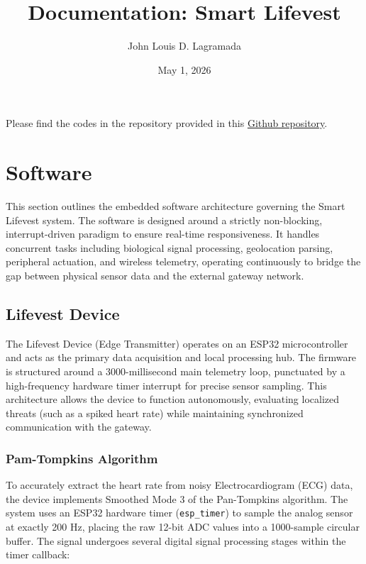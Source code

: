\documentclass{article}
\title{Documentation: Smart Lifevest}
\author{John Louis D. Lagramada}
\date{May 1, 2026}
\begin{document}
\maketitle

Please find the codes in the repository provided in this \href{https://github.com/lukasdante/esp32-lifevest-telemetry-2}{Github repository}.

\section{Software}
This section outlines the embedded software architecture governing the Smart Lifevest system. The software is designed around a strictly non-blocking, interrupt-driven paradigm to ensure real-time responsiveness. It handles concurrent tasks including biological signal processing, geolocation parsing, peripheral actuation, and wireless telemetry, operating continuously to bridge the gap between physical sensor data and the external gateway network.
\subsection{Lifevest Device}
The Lifevest Device (Edge Transmitter) operates on an ESP32 microcontroller and acts as the primary data acquisition and local processing hub. The firmware is structured around a 3000-millisecond main telemetry loop, punctuated by a high-frequency hardware timer interrupt for precise sensor sampling. This architecture allows the device to function autonomously, evaluating localized threats (such as a spiked heart rate) while maintaining synchronized communication with the gateway.

\subsubsection{Pam-Tompkins Algorithm}
To accurately extract the heart rate from noisy Electrocardiogram (ECG) data, the device implements Smoothed Mode 3 of the Pan-Tompkins algorithm. The system uses an ESP32 hardware timer (\verb|esp_timer|) to sample the analog sensor at exactly 200 Hz, placing the raw 12-bit ADC values into a 1000-sample circular buffer. The signal undergoes several digital signal processing stages within the timer callback:
\end{document}
